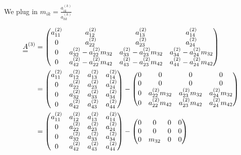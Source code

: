 We plug in $m_{ik} = \frac{a^{(k)}_{ik}}{a^{(k)}_{kk}}$

\begin{equation}
    \begin{aligned}
    \mat{A}^{(3)} &= 
    \begin{pmatrix}
    a_{11}^{(2)} & a_{12}^{(2)} & a_{13}^{(2)} & a_{14}^{(2)} \\
    0            & a_{22}^{(2)} & a_{23}^{(2)} & a_{24}^{(2)} \\
    0            & a_{32}^{(2)} - a_{22}^{(2)} m_{32} & a_{33}^{(2)} - a_{23}^{(2)} m_{32} & a_{34}^{(2)} - a_{24}^{(2)} m_{32} \\
    0            & a_{42}^{(2)} - a_{22}^{(2)} m_{42} & a_{43}^{(2)} - a_{23}^{(2)} m_{42} & a_{44}^{(2)} - a_{24}^{(2)} m_{42}
    \end{pmatrix} \\
    &= \begin{pmatrix}
    a_{11}^{(2)} & a_{12}^{(2)} & a_{13}^{(2)} & a_{14}^{(2)} \\
    0            & a_{22}^{(2)} & a_{23}^{(2)} & a_{24}^{(2)} \\
    0            & a_{32}^{(2)} & a_{33}^{(2)} & a_{34}^{(2)} \\
    0            & a_{42}^{(2)} & a_{43}^{(2)} & a_{44}^{(2)}
    \end{pmatrix} -   
    \begin{pmatrix}
    0 & 0 & 0 & 0 \\
    0 & 0 & 0 & 0 \\
    0 & a_{22}^{(2)} m_{32} & a_{23}^{(2)} m_{32} & a_{24}^{(2)} m_{32} \\
    0 & a_{22}^{(2)} m_{42} & a_{23}^{(2)} m_{42} & a_{24}^{(2)} m_{42}
    \end{pmatrix} \\
    &= \begin{pmatrix}
    a_{11}^{(2)} & a_{12}^{(2)} & a_{13}^{(2)} & a_{14}^{(2)} \\
    0            & a_{22}^{(2)} & a_{23}^{(2)} & a_{24}^{(2)} \\
    0            & a_{32}^{(2)} & a_{33}^{(2)} & a_{34}^{(2)} \\
    0            & a_{42}^{(2)} & a_{43}^{(2)} & a_{44}^{(2)}
    \end{pmatrix}  -   
    \begin{pmatrix}
    0 & 0 & 0 & 0 \\
    0 & 0 & 0 & 0 \\
    0 & m_{32} & 0 & 0 \\

\end{pmatrix}
\end{aligned}
\end{equation}
